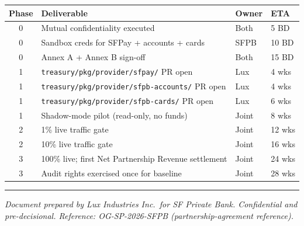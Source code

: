 \documentclass[11pt,letterpaper]{article}
\begin{document}
\begin{tabularx}{\linewidth}{c Y l l}
\toprule
\textbf{Phase} & \textbf{Deliverable} & \textbf{Owner} & \textbf{ETA} \\
 & Mutual confidentiality executed                                 & Both & 5 BD \\
0 & Sandbox creds for SFPay + accounts + cards                       & SFPB & 10 BD \\
0 & Annex A + Annex B sign-off                                       & Both & 15 BD \\
1 & \texttt{treasury/pkg/provider/sfpay/} PR open                    & Lux  & 4 wks \\
1 & \texttt{treasury/pkg/provider/sfpb-accounts/} PR open            & Lux  & 4 wks \\
1 & \texttt{treasury/pkg/provider/sfpb-cards/} PR open               & Lux  & 6 wks \\
1 & Shadow-mode pilot (read-only, no funds)                          & Joint & 8 wks \\
2 & 1\% live traffic gate                                            & Joint & 12 wks \\
2 & 10\% live traffic gate                                           & Joint & 16 wks \\
3 & 100\% live; first Net Partnership Revenue settlement             & Joint & 24 wks \\
3 & Audit rights exercised once for baseline                         & Joint & 28 wks \\
\bottomrule
\end{tabularx}

\vspace{2em}

\noindent\rule{\linewidth}{0.4pt}

\vspace{0.4em}

{\small\itshape
Document prepared by Lux Industries Inc.\ for SF Private Bank.
Confidential and pre-decisional. Reference: OG-SP-2026-SFPB
(partnership-agreement reference).}
\end{document}
